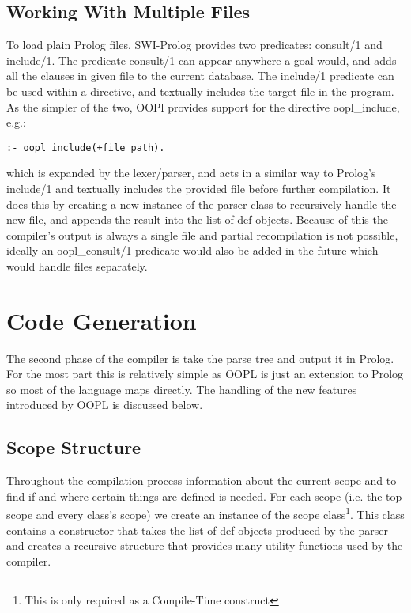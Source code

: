 \documentclass[12pt,a4paper,twoside,openright]{report}
\begin{document}
\subsection{Working With Multiple Files}

To load plain Prolog files, SWI-Prolog provides two predicates: consult/1 and include/1. The predicate consult/1 can appear anywhere a goal would, and adds all the clauses in given file to the current database. The include/1 predicate can be used within a directive, and textually includes the target file in the program. As the simpler of the two, OOPl provides support for the directive oopl_include, e.g.:

\begin{lstlisting}
:- oopl_include(+file_path).
\end{lstlisting}

\noindent which is expanded by the lexer/parser, and acts in a similar way to Prolog's include/1 and textually includes the provided file before further compilation. It does this by creating a new instance of the parser class to recursively handle the new file, and appends the result into the list of def objects. Because of this the compiler's output is always a single file and partial recompilation is not possible, ideally an oopl_consult/1 predicate would also be added in the future which would handle files separately.

\section{Code Generation}
\label{sec:gen}
The second phase of the compiler is take the parse tree and output it in Prolog. For the most part this is relatively simple as OOPL is just an extension to Prolog so most of the language maps directly. The handling of the new features introduced by OOPL is discussed below.

\subsection{Scope Structure}

Throughout the compilation process information about the current scope and to find if and where certain things are defined is needed. For each scope (i.e. the top scope and every class's scope) we create an instance of the scope class\footnote{This is only required as a Compile-Time construct}. This class contains a constructor that takes the list of def objects produced by the parser and creates a recursive structure that provides many utility functions used by the compiler. 
\end{document}
